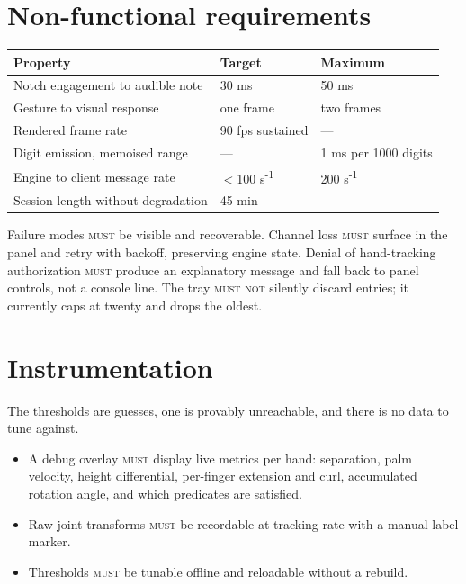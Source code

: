 \documentclass[11pt,a4paper]{article}
\newcommand{\MUST}{\textsc{must}}
\newcommand{\MUSTNOT}{\textsc{must not}}
\theoremstyle{definition}
\theoremstyle{plain}
\theoremstyle{remark}
\begin{document}
\section{Non-functional requirements}

\begin{center}
\begin{tabular}{lll}
\toprule
\textbf{Property} & \textbf{Target} & \textbf{Maximum} \\
\midrule
Notch engagement to audible note & 30 ms & 50 ms \\
Gesture to visual response & one frame & two frames \\
Rendered frame rate & 90 fps sustained & --- \\
Digit emission, memoised range & --- & 1 ms per 1000 digits \\
Engine to client message rate & $<$100 s\textsuperscript{-1} & 200 s\textsuperscript{-1} \\
Session length without degradation & 45 min & --- \\
\bottomrule
\end{tabular}
\end{center}

Failure modes \MUST{} be visible and recoverable. Channel loss \MUST{} surface in the panel and
retry with backoff, preserving engine state. Denial of hand-tracking authorization \MUST{} produce
an explanatory message and fall back to panel controls, not a console line. The tray \MUSTNOT{}
silently discard entries; it currently caps at twenty and drops the oldest.

\section{Instrumentation}
\label{sec:instrumentation}

The thresholds are guesses, one is provably unreachable, and there is no data to tune against.

\begin{itemize}[leftmargin=*]
\item A debug overlay \MUST{} display live metrics per hand: separation, palm velocity, height
      differential, per-finger extension and curl, accumulated rotation angle, and which predicates
      are satisfied.
\item Raw joint transforms \MUST{} be recordable at tracking rate with a manual label marker.
\item Thresholds \MUST{} be tunable offline and reloadable without a rebuild.
\end{itemize}
\end{document}
